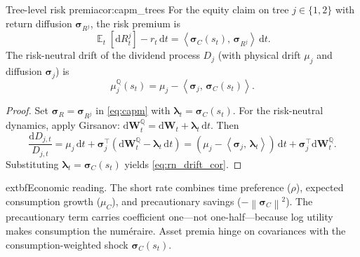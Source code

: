﻿\documentclass[11pt,letterpaper,oneside]{article}
\numberwithin{equation}{section}
\DeclareMathOperator{\E}{\mathbb{E}}
\newcommand{\1}{\mathbf{1}}
\newcommand{\diff}{\mathrm{d}}
\newcommand{\norm}[1]{\left\lVert #1\right\rVert}
\newcommand{\ip}[2]{\left\langle #1,\,#2\right\rangle}
\begin{document}
\begin{corollary}{Tree-level risk premia}{cor:capm_trees}
For the equity claim on tree $j\in\{1,2\}$ with return diffusion $\bm{\sigma}_{R^j}$, the risk premium is
\begin{equation}\label{eq:tree_capm}
  \E_t[\diff R^j_t]-r_t\,\diff t=\ip{\bm{\sigma}_C(s_t)}{\bm{\sigma}_{R^j}}\,\diff t.
\end{equation}
The risk-neutral drift of the dividend process $D_j$ (with physical drift $\mu_j$ and diffusion $\bm{\sigma}_j$) is
\begin{equation}\label{eq:rn_drift_cor}
  \mu_j^{\mathbb{Q}}(s_t)=\mu_j-\ip{\bm{\sigma}_j}{\bm{\sigma}_C(s_t)}.
\end{equation}
\end{corollary}
\begin{proof}
Set $\bm{\sigma}_R=\bm{\sigma}_{R^j}$ in \eqref{eq:capm} with $\bm{\lambda}_t=\bm{\sigma}_C(s_t)$. For the risk-neutral dynamics, apply Girsanov: $\diff\bm{W}_t^{\mathbb{Q}}=\diff\bm{W}_t+\bm{\lambda}_t\,\diff t$. Then
\[
  \frac{\diff D_{j,t}}{D_{j,t}}=\mu_j\,\diff t+\bm{\sigma}_j^{\top}(\diff\bm{W}_t^{\mathbb{Q}}-\bm{\lambda}_t\,\diff t)
  = (\mu_j-\ip{\bm{\sigma}_j}{\bm{\lambda}_t})\,\diff t + \bm{\sigma}_j^{\top}\diff\bm{W}_t^{\mathbb{Q}}.
\]
Substituting $\bm{\lambda}_t=\bm{\sigma}_C(s_t)$ yields \eqref{eq:rn_drift_cor}.
\end{proof}

\begin{tcolorbox}[didacticstyle]
	extbf{Economic reading.} The short rate combines time preference ($\rho$), expected consumption growth ($\mu_C$), and precautionary savings ($-\norm{\bm{\sigma}_C}^2$). The precautionary term carries coefficient one---not one-half---because log utility makes consumption the num\'eraire. Asset premia hinge on covariances with the consumption-weighted shock $\bm{\sigma}_C(s_t)$.
\end{tcolorbox}
\end{document}
